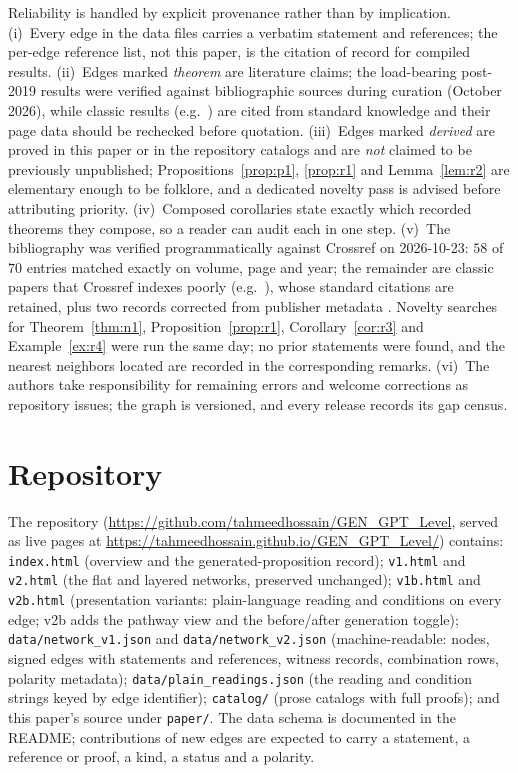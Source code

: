 \documentclass[11pt,a4paper]{article}
\theoremstyle{definition}
\begin{document}
Reliability is handled by explicit provenance rather than by implication.
(i)~Every edge in the data files carries a verbatim statement and references;
the per-edge reference list, not this paper, is the citation of record for
compiled results. (ii)~Edges marked \emph{theorem} are literature claims; the
load-bearing post-2019 results were verified against bibliographic sources
during curation (October 2026), while classic results (e.g.\
\cite{hudson1974,groenewold1946,moyal1949,fine1982,werner1989}) are cited from
standard knowledge and their page data should be rechecked before quotation.
(iii)~Edges marked \emph{derived} are proved in this paper or in the
repository catalogs and are \emph{not} claimed to be previously unpublished;
Propositions~\ref{prop:p1}, \ref{prop:r1} and Lemma~\ref{lem:r2} are
elementary enough to be folklore, and a dedicated novelty pass is advised
before attributing priority. (iv)~Composed corollaries state exactly which
recorded theorems they compose, so a reader can audit each in one step.
(v)~The bibliography was verified programmatically against Crossref on
2026-10-23: $58$ of $70$ entries matched exactly on volume, page and year; the
remainder are classic papers that Crossref indexes poorly (e.g.\
\cite{chsh1969,moyal1949,stueckelberg1960,tsirelson1980,hudson1974}), whose
standard citations are retained, plus two records corrected from publisher
metadata \cite{xu2022,nobroadcast2024}. Novelty searches for
Theorem~\ref{thm:n1}, Proposition~\ref{prop:r1}, Corollary~\ref{cor:r3} and
Example~\ref{ex:r4} were run the same day; no prior statements were found, and
the nearest neighbors located are recorded in the corresponding remarks.
(vi)~The authors take responsibility for remaining errors and welcome
corrections as repository issues; the graph is versioned, and every release
records its gap census.

\section{Repository}\label{sec:repo}

The repository (\url{https://github.com/tahmeedhossain/GEN_GPT_Level}, served
as live pages at \url{https://tahmeedhossain.github.io/GEN_GPT_Level/})
contains: \texttt{index.html} (overview and the generated-proposition record);
\texttt{v1.html} and \texttt{v2.html} (the flat and layered networks,
preserved unchanged); \texttt{v1b.html} and \texttt{v2b.html} (presentation
variants: plain-language reading and conditions on every edge; v2b adds the
pathway view and the before/after generation toggle);
\texttt{data/network\_v1.json} and \texttt{data/network\_v2.json}
(machine-readable: nodes, signed edges with statements and references, witness
records, combination rows, polarity metadata);
\texttt{data/plain\_readings.json} (the reading and condition strings keyed
by edge identifier); \texttt{catalog/} (prose catalogs with full proofs); and
this paper's source under \texttt{paper/}. The data schema is documented in
the README; contributions of new edges are expected to carry a statement, a
reference or proof, a kind, a status and a polarity.
\end{document}
